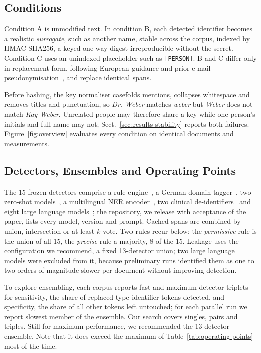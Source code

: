 \subsection{Conditions}\label{sec:conditions}

Condition A is unmodified text. In condition B, each detected identifier becomes a realistic \emph{surrogate},
such as another name, stable across the corpus, indexed by HMAC-SHA256, a keyed one-way digest
irreproducible without the secret. Condition C uses an unindexed placeholder such as
\texttt{[PERSON]}. B and C differ only in replacement form, following European guidance and prior
e-mail pseudonymisation~\cite{enisa2021pseudonymisation,eder2019emails}, and replace identical
spans.

Before hashing, the key normaliser casefolds mentions, collapses whitespace and removes titles and
punctuation, so \emph{Dr. Weber} matches \emph{weber} but \emph{Weber} does not match \emph{Kay
Weber}. Unrelated people may therefore share a key while one person's initials and full name may
not; Sect.~\ref{sec:results-stability} reports both failures. Figure~\ref{fig:overview} evaluates
every condition on identical documents and measurements.


\subsection{Detectors, Ensembles and Operating Points}\label{sec:detectors}

The 15 frozen detectors comprise a rule engine~\cite{presidio}, a German domain
tagger~\cite{akbik2019flair,eder2019emails}, two zero-shot models~\cite{zaratiana2024gliner}, a
multilingual {NER} encoder~\cite{conneau2020xlmr}, two clinical
de-identifiers~\cite{chambon2023deid,johnson2020deid} and eight large language
models~\cite{openai2025gptoss,gemma2026gemma4,microsoft2025phi4mini,mistral2025magistral,qwen2025qwen3,granite41,mistralsmall32};
the repository, we release with acceptance of the paper, lists every model, version
and prompt. Cached spans are combined by union, intersection or at-least-$k$ vote. Two rules recur
below: the \emph{permissive} rule is the union of all 15, the \emph{precise} rule a majority, 8 of
the 15. Leakage uses the configuration we recommend, a fixed 13-detector union; two large language
models were excluded from it, because preliminary runs identified them as one to
two orders of magnitude slower per document without improving detection. 

To explore ensembling, each corpus reports fast and maximum detector triplets for sensitivity, the share of replaced-type
identifier tokens detected, and specificity, the share of all other tokens left untouched; for each parallel run we report slowest member of the ensemble. 
Our search covers singles, pairs and triples. Still for maximum performance, we recommended the 13-detector ensemble.
Note that it does exceed the maximum of Table~\ref{tab:operating-points} most of the time.

